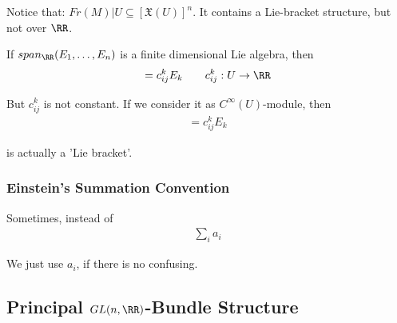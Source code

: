\documentclass[Total.tex]{subfiles}
\begin{document}
			Notice that: $Fr(M)|U\subseteq [\mathfrak{X}(U)]^n$. It contains a Lie-bracket structure, but not over $\RR$.
			
			If $span_\RR(E_1,\dots,E_n)$ is a finite dimensional Lie algebra, then
			\begin{gather*}
				[E_i,E_j]=c_{ij}^kE_k\qquad c_{ij}^k:U\rightarrow \RR
			\end{gather*}
			
			But $c_{ij}^k$ is not constant. If we consider it as $C^\infty(U)$-module, then
			\begin{gather*}
				[E_i,E_j]=c^k_{ij}E_k
			\end{gather*}
			
			is actually a 'Lie bracket'.
			\subsubsection{Einstein's Summation Convention}
				Sometimes, instead of
				\begin{gather*}
					\sum_i a_i
				\end{gather*}
				
				We just use $a_i$, if there is no confusing. 
			\subsection{Principal $GL(n,\RR)$-Bundle Structure}
				
\end{document}
